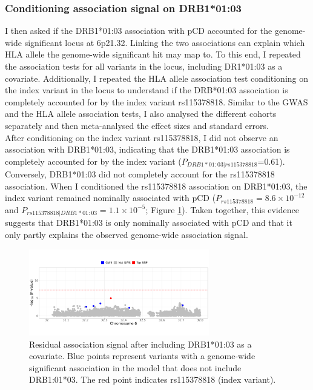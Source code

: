 \subsubsection{Conditioning association signal on DRB1*01:03}
I then asked if the DRB1*01:03 association with pCD accounted for the genome-wide significant locus at 6p21.32. Linking the two associations can explain which HLA allele the genome-wide significant hit may map to. To this end, I repeated the association tests for all variants in the locus, including DR1*01:03 as a covariate. Additionally, I repeated the HLA allele association test conditioning on the index variant in the locus to understand if the DRB*01:03 association is completely accounted for by the index variant rs115378818. Similar to the GWAS and the HLA allele association tests, I also analysed the different cohorts separately and then meta-analysed the effect sizes and standard errors.\\


After conditioning on the index variant rs115378818, I did not observe an association with DRB1*01:03, indicating that the  DRB1*01:03 association is completely accounted for by the index variant ($P_{DRB1*01:03|rs115378818}$=0.61). Conversely, DRB1*01:03 did not completely account for the rs115378818 association. When I conditioned the rs115378818 association on DRB1*01:03, the index variant remained nominally associated with pCD ($P_{rs115378818}=8.6\times10^{-12}$ and  $P_{rs115378818|DRB1*01:03}=1.1\times10^{-5}$; Figure \ref{fig:residual_assoc_plot}). Taken together, this evidence suggests that  DRB1*01:03 is only nominally associated with pCD and that it only partly explains the observed genome-wide association signal. 

 
\begin{figure}[H] 
  \centering    
  \includegraphics[width=0.7\textwidth]{Vector/cond_regional_assoc_plot}
  \caption[Regional association plot of 6p21.32 conditional on HLA-DRB1*01:03]{Residual association signal after including DRB1*01:03 as a covariate. Blue points represent variants with a genome-wide significant association in the model that does not include DRB1:01*03. The red point indicates rs115378818 (index variant).}
  \label{fig:residual_assoc_plot}
  \end{figure}

